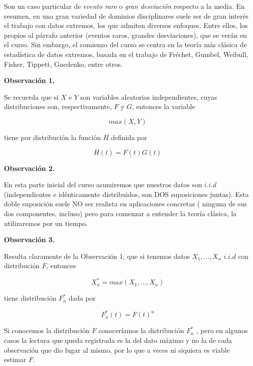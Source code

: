 \documentclass[
  oneside]{book}
\begin{document}
Son un caso particular de \textit{evento raro} o
\textit{gran desviación} respecto a la media. En resumen, en una gran
variedad de dominios disciplinares suele ser de gran interés el trabajo
con datos extremos, los que admiten diversos enfoques. Entre ellos, los
propios al párrafo anterior (eventos raros, grandes desviaciones), que
se verán en el curso. Sin embargo, el comienzo del curso se centra en la
teoría más clásica de estadística de datos extremos, basada en el
trabajo de Fréchet, Gumbel, Weibull, Fisher, Tippett, Gnedenko, entre
otros.

\textbf{Observación 1.}

Se recuerda que si \(X\) e \(Y\) son variables aleatorias
independientes, cuyas distribuciones son, respectivamente, \(F\) y
\(G\), entonces la variable

\begin{equation}
max(X,Y)
\end{equation}

tiene por distribución la función \(H\) definida por

\begin{equation}
H(t)= F(t) G(t)
\end{equation}

\textbf{Observación 2.}

En esta parte inicial del curso asumiremos que nuestros datos son
\(i.i.d\) (independientes e idénticamente distribuidos, son DOS
suposiciones juntas). Esta doble suposición suele NO ser realista en
aplicaciones concretas ( ninguna de sus dos componentes, incluso) pero
para comenzar a entender la teoría clásica, la utilizaremos por un
tiempo.

\textbf{Observación 3.}

Resulta claramente de la Observación 1, que si tenemos datos
\(X_1,...,X_n\) \(i.i.d\) con distribución \(F\), entonces

\begin{equation}
X_n^* = max (X_1,...,X_n)
\end{equation}

tiene distribución \(F_n^*\) dada por

\begin{equation}
F_n^* (t)= F(t)^n
\end{equation}

Si conocemos la distribución \(F\) conoceríamos la distribución
\(F_n^*\) , pero en algunos casos la lectura que queda registrada es la
del dato máximo y no la de cada observación que dio lugar al mismo, por
lo que a veces ni siquiera es viable estimar \(F\).
\end{document}
